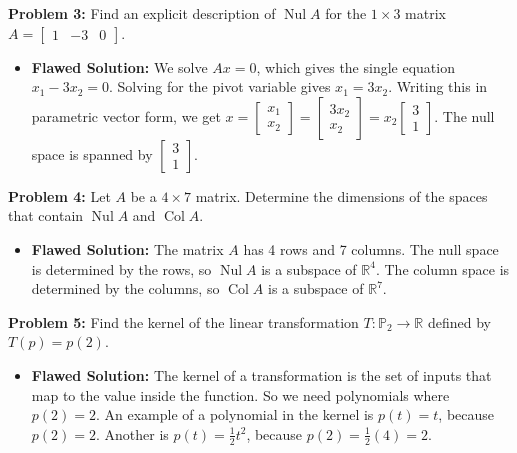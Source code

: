 \documentclass[11pt]{article}
\begin{document}
\vspace{0.5cm}
\textbf{Problem 3:} Find an explicit description of $\operatorname{Nul} A$ for the $1 \times 3$ matrix $A = \begin{bmatrix} 1 & -3 & 0 \end{bmatrix}$.
\begin{itemize}
    \item \textbf{Flawed Solution:} We solve $Ax = 0$, which gives the single equation $x_1 - 3x_2 = 0$. Solving for the pivot variable gives $x_1 = 3x_2$. Writing this in parametric vector form, we get $x = \begin{bmatrix} x_1 \\ x_2 \end{bmatrix} = \begin{bmatrix} 3x_2 \\ x_2 \end{bmatrix} = x_2 \begin{bmatrix} 3 \\ 1 \end{bmatrix}$. The null space is spanned by $\begin{bmatrix} 3 \\ 1 \end{bmatrix}$.
\end{itemize}

\vspace{0.5cm}
\textbf{Problem 4:} Let $A$ be a $4 \times 7$ matrix. Determine the dimensions of the spaces that contain $\operatorname{Nul} A$ and $\operatorname{Col} A$.
\begin{itemize}
    \item \textbf{Flawed Solution:} The matrix $A$ has 4 rows and 7 columns. The null space is determined by the rows, so $\operatorname{Nul} A$ is a subspace of $\mathbb{R}^4$. The column space is determined by the columns, so $\operatorname{Col} A$ is a subspace of $\mathbb{R}^7$.
\end{itemize}

\vspace{0.5cm}
\textbf{Problem 5:} Find the kernel of the linear transformation $T: \mathbb{P}_2 \to \mathbb{R}$ defined by $T(p) = p(2)$.
\begin{itemize}
    \item \textbf{Flawed Solution:} The kernel of a transformation is the set of inputs that map to the value inside the function. So we need polynomials where $p(2) = 2$. An example of a polynomial in the kernel is $p(t) = t$, because $p(2) = 2$. Another is $p(t) = \frac{1}{2}t^2$, because $p(2) = \frac{1}{2}(4) = 2$.
\end{itemize}
\end{document}
